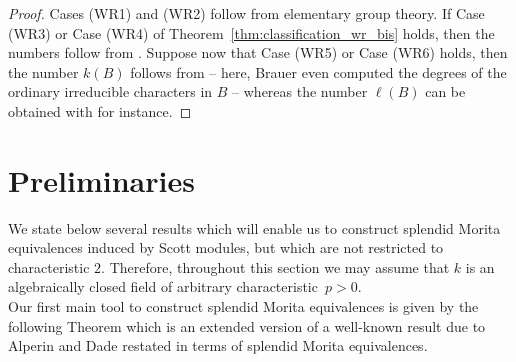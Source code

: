 \documentclass[12pt,a4paper]{amsart}
\theoremstyle{plain}\newtheorem{Theorem}{Theorem}[section]
\theoremstyle{plain}\newtheorem{Conjecture}[Theorem]{Conjecture}
\theoremstyle{plain}\newtheorem{Corollary}[Theorem]{Corollary}
\theoremstyle{plain}\newtheorem{Lemma}[Theorem]{Lemma}
\theoremstyle{plain}\newtheorem{Proposition}[Theorem]{Proposition}
\theoremstyle{definition}\newtheorem{Definition}[Theorem]{Definition}
\theoremstyle{definition}\newtheorem{Example}[Theorem]{Example}
\theoremstyle{definition}\newtheorem{Examples}[Theorem]{Examples}
\theoremstyle{definition}\newtheorem{Remark}[Theorem]{Remark}
\theoremstyle{definition}\newtheorem{Question}[Theorem]{Question}
\theoremstyle{definition}\newtheorem{Notation}[Theorem]{Notation}
\theoremstyle{definition}\newtheorem{Hypothesis}[Theorem]{Hypothesis}
\theoremstyle{definition}\newtheorem{Assumption}[Theorem]{Assumption}
\theoremstyle{definition}\newtheorem{Strategy}[Theorem]{Strategy}
\theoremstyle{definition}\newtheorem{Contents}[Theorem]{Contents}
\theoremstyle{definition}\newtheorem{Computations}[Theorem]{Computations}
\theoremstyle{definition}\newtheorem{Equivalences}[Theorem]{Equivalences}
\theoremstyle{definition}\newtheorem{Notation/Definition}[Theorem]{Notation/Definition}
\theoremstyle{definition}\newtheorem{noth}[Theorem]{}
\theoremstyle{plain}\newtheorem{Step}[Theorem]{Step}
\begin{document}
\begin{proof} 
Cases {\rm\sf (WR1)} and {\rm\sf (WR2)} follow from elementary group theory.
If Case {\rm\sf (WR3)} 
or Case {\rm\sf (WR4)} of Theorem~\ref{thm:classification_wr_bis} holds, then the numbers follow from 
\cite[Proposition~(7.G)]{Kue80}. %
Suppose now that Case {\rm\sf (WR5)} or Case {\rm\sf (WR6)} holds, then the 
number $k(B)$ follows from \cite[{\color{black}Theorem 1A}]{Brauerwr} -- 
here, Brauer even computed the degrees of the ordinary irreducible characters in $B$ -- 
whereas the number $\ell(B)$ can 
be obtained with \cite[Lemma~7.I]{Kue80} for instance.
\end{proof}




\section{Preliminaries}\label{sec:pre} 

We state below several results which will enable us to construct 
splendid Morita equivalences induced by Scott modules, but which are not restricted to characteristic $2$.
Therefore, throughout this section we may assume that $k$ is an algebraically 
closed field of arbitrary characteristic~$p>0$. \\


Our first main tool to construct splendid Morita equivalences is given by the 
following Theorem which is an extended version  
of a well-known result due to Alperin  \cite{Alp76} and Dade \cite{Dad77} 
 restated in terms of splendid Morita equivalences. 
\end{document}

